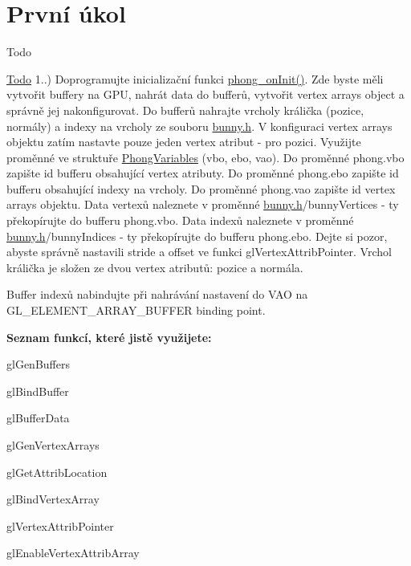 \hypertarget{group__task1}{\section{První úkol}
\label{group__task1}
}
\begin{DoxyRefDesc}{Todo}
\item[\hyperlink{todo__todo000004}{Todo}]1..) Doprogramujte inicializační funkci \hyperlink{student_8h_ac2adb2ba4e748239b9db4d037584d3cc}{phong\-\_\-on\-Init()}. Zde byste měli vytvořit buffery na G\-P\-U, nahrát data do bufferů, vytvořit vertex arrays object a správně jej nakonfigurovat. Do bufferů nahrajte vrcholy králička (pozice, normály) a indexy na vrcholy ze souboru \hyperlink{bunny_8h}{bunny.\-h}. V konfiguraci vertex arrays objektu zatím nastavte pouze jeden vertex atribut -\/ pro pozici. Využijte proměnné ve struktuře \hyperlink{structPhongVariables}{Phong\-Variables} (vbo, ebo, vao). Do proměnné phong.\-vbo zapište id bufferu obsahující vertex atributy. Do proměnné phong.\-ebo zapište id bufferu obsahující indexy na vrcholy. Do proměnné phong.\-vao zapište id vertex arrays objektu. Data vertexů naleznete v proměnné \hyperlink{bunny_8h}{bunny.\-h}/bunny\-Vertices -\/ ty překopírujte do bufferu phong.\-vbo. Data indexů naleznete v proměnné \hyperlink{bunny_8h}{bunny.\-h}/bunny\-Indices -\/ ty překopírujte do bufferu phong.\-ebo. Dejte si pozor, abyste správně nastavili stride a offset ve funkci gl\-Vertex\-Attrib\-Pointer. Vrchol králička je složen ze dvou vertex atributů\-: pozice a normála.\par
 Buffer indexů nabindujte při nahrávání nastavení do V\-A\-O na G\-L\-\_\-\-E\-L\-E\-M\-E\-N\-T\-\_\-\-A\-R\-R\-A\-Y\-\_\-\-B\-U\-F\-F\-E\-R binding point.\par
 {\bfseries Seznam funkcí, které jistě využijete\-:}
\begin{DoxyItemize}
\item gl\-Gen\-Buffers
\item gl\-Bind\-Buffer
\item gl\-Buffer\-Data
\item gl\-Gen\-Vertex\-Arrays
\item gl\-Get\-Attrib\-Location
\item gl\-Bind\-Vertex\-Array
\item gl\-Vertex\-Attrib\-Pointer
\item gl\-Enable\-Vertex\-Attrib\-Array 
\end{DoxyItemize}\end{DoxyRefDesc}


